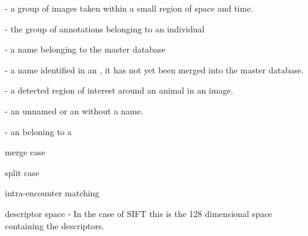 
\occurrence - a group of images taken within a small region of space and time.

\name - the group of annotations belonging to an individual

\mastername - a name belonging to the master database

\encounter - a name identified in an \occurrence, it has not yet been merged into the master database.

\annotation - a detected region of interest around an animal in an image.

\unknownannotation - an unnamed \annotation or an \annotation without a name.

\exemplar - an \annotation beloning to a \name 


merge case

split case


intra-encounter matching


{descriptor space} - In the case of SIFT this is the 128 dimensional space containing the descriptors.


